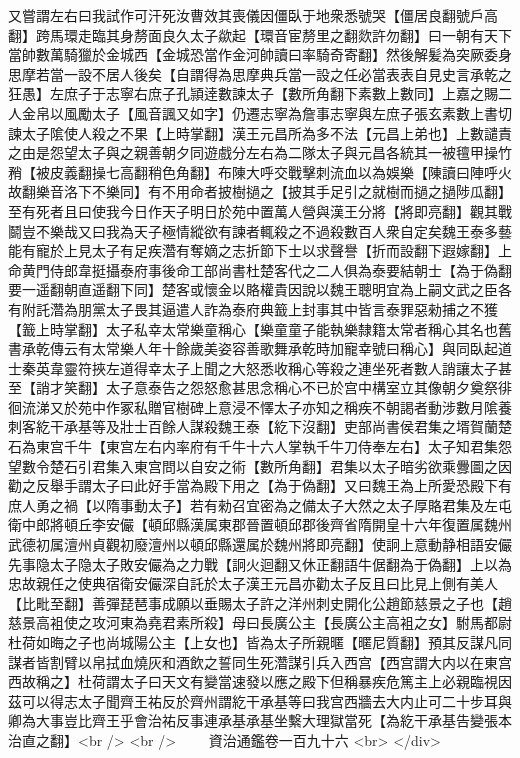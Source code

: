 又嘗謂左右曰我試作可汗死汝曹效其喪儀因僵臥于地衆悉號哭【僵居良翻號戶高翻】跨馬環走臨其身剺面良久太子歘起【環音宦剺里之翻欻許勿翻】曰一朝有天下當帥數萬騎獵於金城西【金城恐當作金河帥讀曰率騎奇寄翻】然後解髪為突厥委身思摩若當一設不居人後矣【自謂得為思摩典兵當一設之任必當表表自見史言承乾之狂愚】左庶子于志寧右庶子孔頴逹數諫太子【數所角翻下素數上數同】上嘉之賜二人金帛以風勵太子【風音諷又如字】仍遷志寧為詹事志寧與左庶子張玄素數上書切諫太子隂使人殺之不果【上時掌翻】漢王元昌所為多不法【元昌上弟也】上數譴責之由是怨望太子與之親善朝夕同遊戲分左右為二隊太子與元昌各統其一被氊甲操竹矟【被皮義翻操七高翻稍色角翻】布陳大呼交戰擊刺流血以為娛樂【陳讀曰陣呼火故翻樂音洛下不樂同】有不用命者披樹撾之【披其手足引之就樹而撾之撾陟瓜翻】至有死者且曰使我今日作天子明日於苑中置萬人營與漢王分將【將即亮翻】觀其戰鬬豈不樂哉又曰我為天子極情縱欲有諫者輒殺之不過殺數百人衆自定矣魏王泰多藝能有寵於上見太子有足疾濳有奪嫡之志折節下士以求聲譽【折而設翻下遐嫁翻】上命黄門侍郎韋挺攝泰府事後命工部尚書杜楚客代之二人俱為泰要結朝士【為于偽翻要一遥翻朝直遥翻下同】楚客或懷金以賂權貴因說以魏王聰明宜為上嗣文武之臣各有附託濳為朋黨太子畏其逼遣人詐為泰府典籖上封事其中皆言泰罪惡勑捕之不獲【籖上時掌翻】太子私幸太常樂童稱心【樂童童子能執樂隸籍太常者稱心其名也舊書承乾傳云有太常樂人年十餘歲美姿容善歌舞承乾時加寵幸號曰稱心】與同臥起道士秦英韋靈符挾左道得幸太子上聞之大怒悉收稱心等殺之連坐死者數人誚讓太子甚至【誚才笑翻】太子意泰告之怨怒愈甚思念稱心不已於宫中構室立其像朝夕奠祭徘徊流涕又於苑中作冢私贈官樹碑上意浸不懌太子亦知之稱疾不朝謁者動涉數月隂養刺客紇干承基等及壯士百餘人謀殺魏王泰【紇下沒翻】吏部尚書侯君集之壻賀蘭楚石為東宫千牛【東宫左右内率府有千牛十六人掌執千牛刀侍奉左右】太子知君集怨望數令楚石引君集入東宫問以自安之術【數所角翻】君集以太子暗劣欲乘釁圖之因勸之反舉手謂太子曰此好手當為殿下用之【為于偽翻】又曰魏王為上所愛恐殿下有庶人勇之禍【以隋事動太子】若有勑召宜密為之備太子大然之太子厚賂君集及左屯衛中郎將頓丘李安儼【頓邱縣漢属東郡晉置頓邱郡後齊省隋開皇十六年復置属魏州武德初属澶州貞觀初廢澶州以頓邱縣還属於魏州將即亮翻】使詗上意動静相語安儼先事隐太子隐太子敗安儼為之力戰【詗火迴翻又休正翻語牛倨翻為于偽翻】上以為忠故親任之使典宿衛安儼深自託於太子漢王元昌亦勸太子反且曰比見上側有美人【比毗至翻】善彈琵琶事成願以垂賜太子許之洋州刺史開化公趙節慈景之子也【趙慈景高袓使之攻河東為堯君素所殺】母曰長廣公主【長廣公主高袓之女】駙馬都尉杜荷如晦之子也尚城陽公主【上女也】皆為太子所親暱【暱尼質翻】預其反謀凡同謀者皆割臂以帛拭血燒灰和酒飲之誓同生死濳謀引兵入西宫【西宫謂大内以在東宫西故稱之】杜荷謂太子曰天文有變當速發以應之殿下但稱暴疾危篤主上必親臨視因茲可以得志太子聞齊王祐反於齊州謂紇干承基等曰我宫西牆去大内止可二十步耳與卿為大事豈比齊王乎會治祐反事連承基承基坐繫大理獄當死【為紇干承基告變張本治直之翻】<br />
<br />
　　資治通鑑卷一百九十六  <br>
   </div> 

